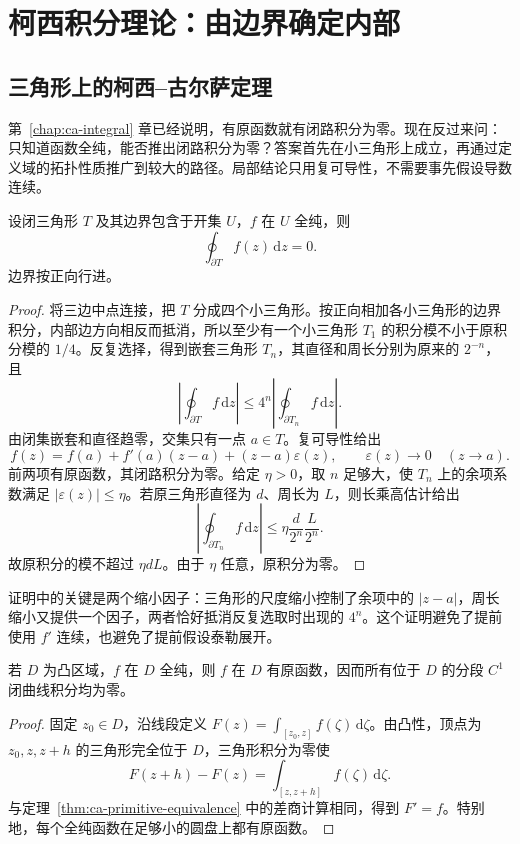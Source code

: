 \setcounter{chapter}{5} %
\chapter{柯西积分理论：由边界确定内部}
\label{chap:ca-cauchy}

\section{三角形上的柯西--古尔萨定理}

第~\ref{chap:ca-integral} 章已经说明，有原函数就有闭路积分为零。现在反过来问：只知道函数全纯，能否推出闭路积分为零？答案首先在小三角形上成立，再通过定义域的拓扑性质推广到较大的路径。局部结论只用复可导性，不需要事先假设导数连续。

\begin{theorem}[柯西--古尔萨定理的三角形形式]
\label{thm:ca-goursat}
设闭三角形 $T$ 及其边界包含于开集 $U$，$f$ 在 $U$ 全纯，则
\[
 \oint_{\partial T}f(z)\,\mathrm dz=0.
\]
边界按正向行进。
\end{theorem}
\begin{proof}
将三边中点连接，把 $T$ 分成四个小三角形。按正向相加各小三角形的边界积分，内部边方向相反而抵消，所以至少有一个小三角形 $T_1$ 的积分模不小于原积分模的 $1/4$。反复选择，得到嵌套三角形 $T_n$，其直径和周长分别为原来的 $2^{-n}$，且
\[
 \left|\oint_{\partial T}f\,\mathrm dz\right|
 \le4^n\left|\oint_{\partial T_n}f\,\mathrm dz\right|.
\]
由闭集嵌套和直径趋零，交集只有一点 $a\in T$。复可导性给出
\[
 f(z)=f(a)+f'(a)(z-a)+(z-a)\varepsilon(z),
 \qquad\varepsilon(z)\to0\quad(z\to a).
\]
前两项有原函数，其闭路积分为零。给定 $\eta>0$，取 $n$ 足够大，使 $T_n$ 上的余项系数满足 $|\varepsilon(z)|\le\eta$。若原三角形直径为 $d$、周长为 $L$，则长乘高估计给出
\[
 \left|\oint_{\partial T_n}f\,\mathrm dz\right|
 \le\eta\frac d{2^n}\frac L{2^n}.
\]
故原积分的模不超过 $\eta dL$。由于 $\eta$ 任意，原积分为零。
\end{proof}

证明中的关键是两个缩小因子：三角形的尺度缩小控制了余项中的 $|z-a|$，周长缩小又提供一个因子，两者恰好抵消反复选取时出现的 $4^n$。这个证明避免了提前使用 $f'$ 连续，也避免了提前假设泰勒展开。

\begin{corollary}[凸区域上的原函数]
\label{cor:ca-convex-primitive}
若 $D$ 为凸区域，$f$ 在 $D$ 全纯，则 $f$ 在 $D$ 有原函数，因而所有位于 $D$ 的分段 $C^1$ 闭曲线积分均为零。
\end{corollary}
\begin{proof}
固定 $z_0\in D$，沿线段定义 $F(z)=\int_{[z_0,z]}f(\zeta)\,\mathrm d\zeta$。由凸性，顶点为 $z_0,z,z+h$ 的三角形完全位于 $D$，三角形积分为零使
\[
 F(z+h)-F(z)=\int_{[z,z+h]}f(\zeta)\,\mathrm d\zeta.
\]
与定理~\ref{thm:ca-primitive-equivalence} 中的差商计算相同，得到 $F'=f$。特别地，每个全纯函数在足够小的圆盘上都有原函数。
\end{proof}

